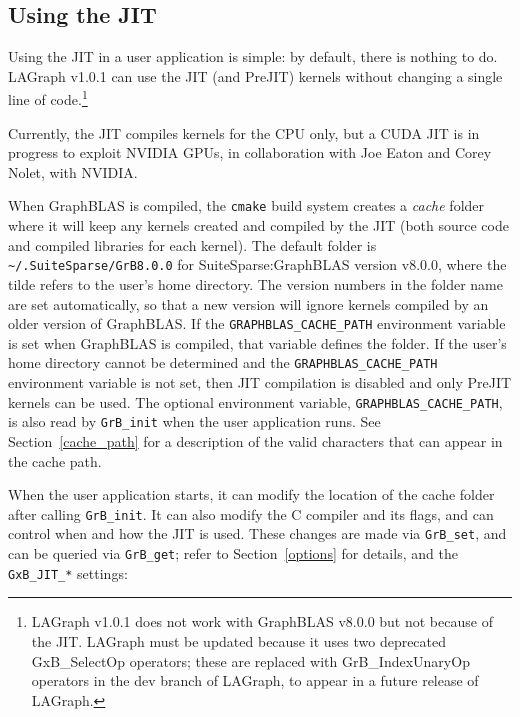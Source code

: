 \documentclass[12pt]{article}
\begin{document}
\subsection{Using the JIT}

Using the JIT in a user application is simple:  by default, there is nothing
to do.  LAGraph v1.0.1 can use the JIT (and PreJIT) kernels without changing
a single line of code.\footnote{LAGraph v1.0.1 does not work with GraphBLAS
v8.0.0 but not because of the JIT.  LAGraph must be updated because it uses two
deprecated {\sf GxB\_SelectOp} operators; these are replaced with {\sf
GrB\_IndexUnaryOp} operators in the {\sf dev} branch of LAGraph, to appear
in a future release of LAGraph.}

Currently, the JIT compiles kernels for the CPU only, but a CUDA JIT is in
progress to exploit NVIDIA GPUs, in collaboration with Joe Eaton and
Corey Nolet, with NVIDIA.

When GraphBLAS is compiled, the \verb'cmake' build system creates a {\em cache}
folder where it will keep any kernels created and compiled by the JIT
(both source code and compiled libraries for each kernel).  The
default folder is \verb'~/.SuiteSparse/GrB8.0.0' for SuiteSparse:GraphBLAS
version v8.0.0, where the tilde refers to the user's home directory.
The version numbers in the folder name are set automatically, so that a new
version will ignore kernels compiled by an older version of GraphBLAS.  If the
\verb'GRAPHBLAS_CACHE_PATH' environment variable is set when GraphBLAS is
compiled, that variable defines the folder.  If the user's home directory
cannot be determined and the \verb'GRAPHBLAS_CACHE_PATH' environment variable
is not set, then JIT compilation is disabled and only PreJIT kernels can be
used.  The optional environment variable, \verb'GRAPHBLAS_CACHE_PATH', is also
read by \verb'GrB_init' when the user application runs.
See Section~\ref{cache_path} for a description of the valid characters
that can appear in the cache path.

When the user application starts, it can modify the location of the cache
folder after calling \verb'GrB_init'.  It can also modify the C compiler and
its flags, and can control when and how the JIT is used.
These changes are
made via \verb'GrB_set', and can be queried via
\verb'GrB_get'; refer to Section~\ref{options} for details, and
the \verb'GxB_JIT_*' settings:
\end{document}
